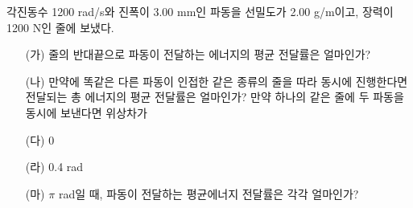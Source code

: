 \documentclass[floatfix,nofootinbib,superscriptaddress,fleqn]{revtex4-2}
\begin{document}
\vspace{1.cm}

각진동수 1200 rad/s와 진폭이 3.00 mm인 파동을 선밀도가 2.00 g/m이고,
장력이 1200 N인 줄에 보냈다.
\begin{itemize}
\item[(가)] 줄의 반대끝으로 파동이 전달하는 에너지의 평균 전달률은
  얼마인가?
\item[(나)] 만약에 똑같은 다른 파동이 인접한 같은 종류의 줄을 따라
  동시에 진행한다면 전달되는 총 에너지의 평균 전달률은 얼마인가? 만약
  하나의 같은 줄에 두 파동을 동시에 보낸다면 위상차가
\item[(다)] 0
\item[(라)] 0.4 rad
\item[(마)] $\pi$ rad일 때, 파동이 전달하는 평균에너지 전달률은 각각
  얼마인가?   
\end{itemize}
\vspace{1.cm}
\end{document}
